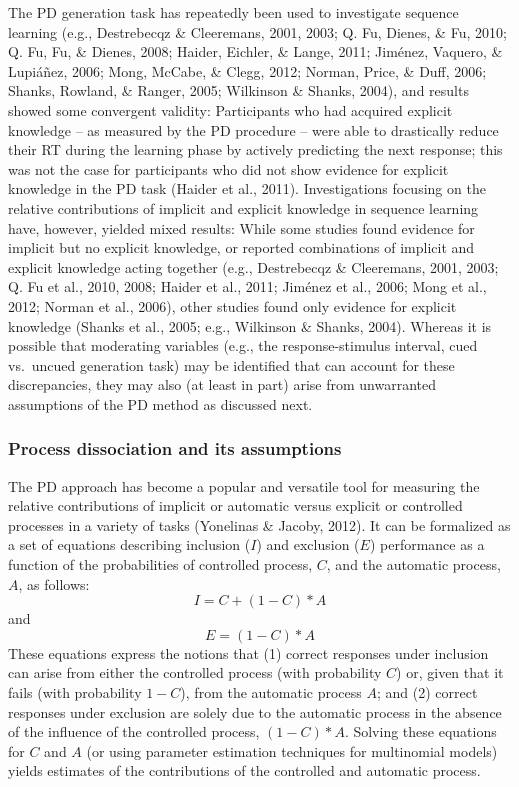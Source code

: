 \documentclass[floatsintext,man]{apa6}
\begin{document}
The PD generation task has repeatedly been used to investigate sequence
learning (e.g., Destrebecqz \& Cleeremans, 2001, 2003; Q. Fu, Dienes, \&
Fu, 2010; Q. Fu, Fu, \& Dienes, 2008; Haider, Eichler, \& Lange, 2011;
Jiménez, Vaquero, \& Lupiáñez, 2006; Mong, McCabe, \& Clegg, 2012;
Norman, Price, \& Duff, 2006; Shanks, Rowland, \& Ranger, 2005;
Wilkinson \& Shanks, 2004), and results showed some convergent validity:
Participants who had acquired explicit knowledge -- as measured by the
PD procedure -- were able to drastically reduce their RT during the
learning phase by actively predicting the next response; this was not
the case for participants who did not show evidence for explicit
knowledge in the PD task (Haider et al., 2011). Investigations focusing
on the relative contributions of implicit and explicit knowledge in
sequence learning have, however, yielded mixed results: While some
studies found evidence for implicit but no explicit knowledge, or
reported combinations of implicit and explicit knowledge acting together
(e.g., Destrebecqz \& Cleeremans, 2001, 2003; Q. Fu et al., 2010, 2008;
Haider et al., 2011; Jiménez et al., 2006; Mong et al., 2012; Norman et
al., 2006), other studies found only evidence for explicit knowledge
(Shanks et al., 2005; e.g., Wilkinson \& Shanks, 2004). Whereas it is
possible that moderating variables (e.g., the response-stimulus
interval, cued vs.~uncued generation task) may be identified that can
account for these discrepancies, they may also (at least in part) arise
from unwarranted assumptions of the PD method as discussed next.

\subsubsection{Process dissociation and its
assumptions}\label{process-dissociation-and-its-assumptions}

The PD approach has become a popular and versatile tool for measuring
the relative contributions of implicit or automatic versus explicit or
controlled processes in a variety of tasks (Yonelinas \& Jacoby, 2012).
It can be formalized as a set of equations describing inclusion (\(I\))
and exclusion (\(E\)) performance as a function of the probabilities of
controlled process, \(C\), and the automatic process, \(A\), as follows:
\[I=C+(1-C)*A\] and \[E=(1-C)*A\] These equations express the notions
that (1) correct responses under inclusion can arise from either the
controlled process (with probability \(C\)) or, given that it fails
(with probability \(1-C\)), from the automatic process \(A\); and (2)
correct responses under exclusion are solely due to the automatic
process in the absence of the influence of the controlled process,
\((1-C)*A\). Solving these equations for \(C\) and \(A\) (or using
parameter estimation techniques for multinomial models) yields estimates
of the contributions of the controlled and automatic process.
\end{document}
